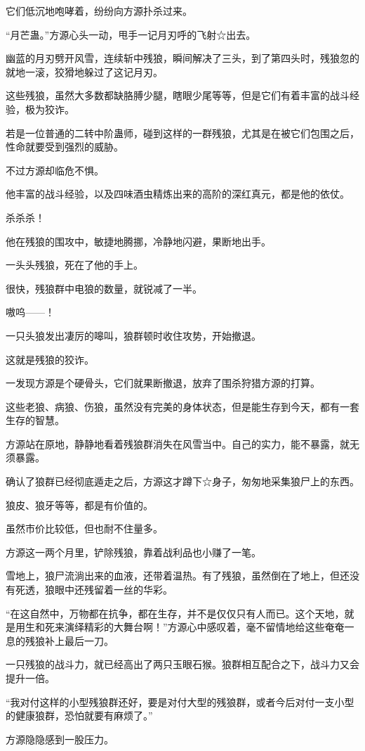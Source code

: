 \begin{this_body}
它们低沉地咆哮着，纷纷向方源扑杀过来。

“月芒蛊。”方源心头一动，甩手一记月刃呼的飞射☆出去。

幽蓝的月刃劈开风雪，连续斩中残狼，瞬间解决了三头，到了第四头时，残狼忽的就地一滚，狡猾地躲过了这记月刃。

这些残狼，虽然大多数都缺胳膊少腿，瞎眼少尾等等，但是它们有着丰富的战斗经验，极为狡诈。

若是一位普通的二转中阶蛊师，碰到这样的一群残狼，尤其是在被它们包围之后，性命就要受到强烈的威胁。

不过方源却临危不惧。

他丰富的战斗经验，以及四味酒虫精炼出来的高阶的深红真元，都是他的依仗。

杀杀杀！

他在残狼的围攻中，敏捷地腾挪，冷静地闪避，果断地出手。

一头头残狼，死在了他的手上。

很快，残狼群中电狼的数量，就锐减了一半。

嗷呜——！

一只头狼发出凄厉的嗥叫，狼群顿时收住攻势，开始撤退。

这就是残狼的狡诈。

一发现方源是个硬骨头，它们就果断撤退，放弃了围杀狩猎方源的打算。

这些老狼、病狼、伤狼，虽然没有完美的身体状态，但是能生存到今天，都有一套生存的智慧。

方源站在原地，静静地看着残狼群消失在风雪当中。自己的实力，能不暴露，就无须暴露。

确认了狼群已经彻底遁走之后，方源这才蹲下☆身子，匆匆地采集狼尸上的东西。

狼皮、狼牙等等，都是有价值的。

虽然市价比较低，但也耐不住量多。

方源这一两个月里，铲除残狼，靠着战利品也小赚了一笔。

雪地上，狼尸流淌出来的血液，还带着温热。有了残狼，虽然倒在了地上，但还没有死透，狼眼中还残留着一丝的华彩。

“在这自然中，万物都在抗争，都在生存，并不是仅仅只有人而已。这个天地，就是用生和死来演绎精彩的大舞台啊！”方源心中感叹着，毫不留情地给这些奄奄一息的残狼补上最后一刀。

一只残狼的战斗力，就已经高出了两只玉眼石猴。狼群相互配合之下，战斗力又会提升一倍。

“我对付这样的小型残狼群还好，要是对付大型的残狼群，或者今后对付一支小型的健康狼群，恐怕就要有麻烦了。”

方源隐隐感到一股压力。


\end{this_body}

